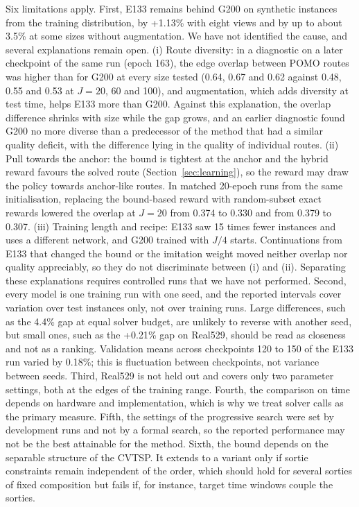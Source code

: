 \documentclass[preprint,12pt,authoryear]{elsarticle}
\begin{document}
Six limitations apply. First, E133 remains behind G200 on synthetic instances from the training distribution, by +1.13\% with eight views and by up to about 3.5\% at some sizes without augmentation. We have not identified the cause, and several explanations remain open. (i) Route diversity: in a diagnostic on a later checkpoint of the same run (epoch 163), the edge overlap between POMO routes was higher than for G200 at every size tested (0.64, 0.67 and 0.62 against 0.48, 0.55 and 0.53 at $J = 20$, 60 and 100), and augmentation, which adds diversity at test time, helps E133 more than G200. Against this explanation, the overlap difference shrinks with size while the gap grows, and an earlier diagnostic found G200 no more diverse than a predecessor of the method that had a similar quality deficit, with the difference lying in the quality of individual routes. (ii) Pull towards the anchor: the bound is tightest at the anchor and the hybrid reward favours the solved route (Section~\ref{sec:learning}), so the reward may draw the policy towards anchor-like routes. In matched 20-epoch runs from the same initialisation, replacing the bound-based reward with random-subset exact rewards lowered the overlap at $J = 20$ from 0.374 to 0.330 and from 0.379 to 0.307. (iii) Training length and recipe: E133 saw 15 times fewer instances and uses a different network, and G200 trained with $J/4$ starts. Continuations from E133 that changed the bound or the imitation weight moved neither overlap nor quality appreciably, so they do not discriminate between (i) and (ii). Separating these explanations requires controlled runs that we have not performed. Second, every model is one training run with one seed, and the reported intervals cover variation over test instances only, not over training runs. Large differences, such as the 4.4\% gap at equal solver budget, are unlikely to reverse with another seed, but small ones, such as the +0.21\% gap on Real529, should be read as closeness and not as a ranking. Validation means across checkpoints 120 to 150 of the E133 run varied by 0.18\%; this is fluctuation between checkpoints, not variance between seeds. Third, Real529 is not held out and covers only two parameter settings, both at the edges of the training range. Fourth, the comparison on time depends on hardware and implementation, which is why we treat solver calls as the primary measure. Fifth, the settings of the progressive search were set by development runs and not by a formal search, so the reported performance may not be the best attainable for the method. Sixth, the bound depends on the separable structure of the CVTSP. It extends to a variant only if sortie constraints remain independent of the order, which should hold for several sorties of fixed composition but fails if, for instance, target time windows couple the sorties.
\end{document}
